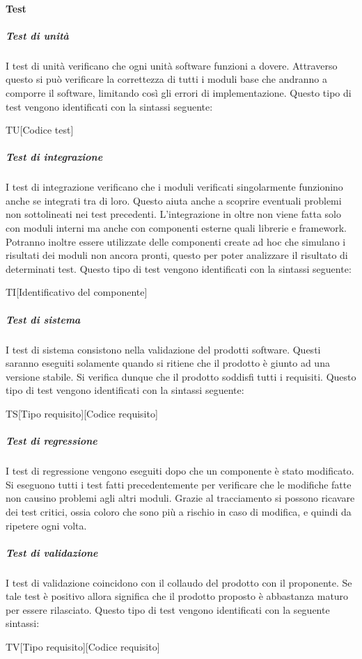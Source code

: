 			\paragraph{Test} %
			\label{par:test}
				\subparagraph{Test di unità}
				I test di unità verificano che ogni unità software funzioni a dovere. Attraverso questo si può verificare la correttezza di tutti i moduli base che andranno a comporre il software, limitando così gli errori di implementazione. Questo tipo di test vengono identificati con la sintassi seguente:\\
				 \begin{center}
				 TU[Codice test]
				 \end{center}
				 \subparagraph{Test di integrazione}
				 I test di integrazione verificano che i moduli verificati singolarmente funzionino anche se integrati tra di loro. Questo aiuta anche a scoprire eventuali problemi non sottolineati nei test precedenti. L'integrazione in oltre non viene fatta solo con moduli interni ma anche con componenti esterne quali librerie e framework.\\
				 Potranno inoltre essere utilizzate delle componenti create ad hoc che simulano i risultati dei moduli non ancora pronti, questo per poter analizzare il risultato di determinati test. Questo tipo di test vengono identificati con la sintassi seguente:\\
				 \begin{center}
				 	TI[Identificativo del componente]
				 \end{center}
				 \subparagraph{Test di sistema}
				 I test di sistema consistono nella validazione del prodotti software. Questi saranno eseguiti solamente quando si ritiene che il prodotto è giunto ad una versione stabile. Si verifica dunque che il prodotto soddisfi tutti i requisiti. Questo tipo di test vengono identificati con la sintassi seguente: \\
				\begin{center}				 
				 TS[Tipo requisito][Codice requisito]
				 \end{center}
				 \subparagraph{Test di regressione}
				 I test di regressione vengono eseguiti dopo che un componente è stato modificato. Si eseguono tutti i test fatti precedentemente per verificare che le modifiche fatte non causino problemi agli altri moduli. Grazie al tracciamento si possono ricavare dei test critici, ossia coloro che sono più a rischio in caso di modifica, e quindi da ripetere ogni volta.
				 \subparagraph{Test di validazione}
				 I test di validazione coincidono con il collaudo del prodotto con il proponente. Se tale test è positivo allora significa che il prodotto proposto è abbastanza maturo per essere rilasciato. Questo tipo di test vengono identificati con la seguente sintassi:\\
				 \begin{center}				 
				 TV[Tipo requisito][Codice requisito]
				 \end{center}
